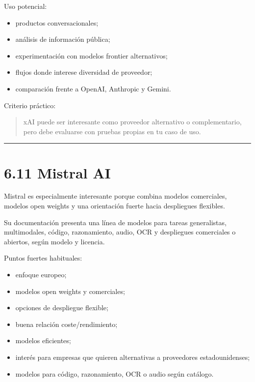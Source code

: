 Uso potencial:

\begin{itemize}
\tightlist
\item
  productos conversacionales;
\item
  análisis de información pública;
\item
  experimentación con modelos frontier alternativos;
\item
  flujos donde interese diversidad de proveedor;
\item
  comparación frente a OpenAI, Anthropic y Gemini.
\end{itemize}

Criterio práctico:

\begin{quote}
xAI puede ser interesante como proveedor alternativo o complementario,
pero debe evaluarse con pruebas propias en tu caso de uso.
\end{quote}

\begin{center}\rule{0.5\linewidth}{0.5pt}\end{center}

\section{6.11 Mistral AI}\label{mistral-ai}

Mistral es especialmente interesante porque combina modelos comerciales,
modelos open weights y una orientación fuerte hacia despliegues
flexibles.

Su documentación presenta una línea de modelos para tareas generalistas,
multimodales, código, razonamiento, audio, OCR y despliegues comerciales
o abiertos, según modelo y licencia.

Puntos fuertes habituales:

\begin{itemize}
\tightlist
\item
  enfoque europeo;
\item
  modelos open weights y comerciales;
\item
  opciones de despliegue flexible;
\item
  buena relación coste/rendimiento;
\item
  modelos eficientes;
\item
  interés para empresas que quieren alternativas a proveedores
  estadounidenses;
\item
  modelos para código, razonamiento, OCR o audio según catálogo.
\end{itemize}

